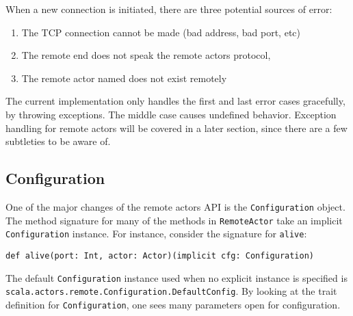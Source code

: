 \documentclass{article}
\begin{document}
When a new connection is initiated, there are three potential sources of error:
\begin{enumerate}
  \item The TCP connection cannot be made (bad address, bad port, etc)
  \item The remote end does not speak the remote actors protocol, 
  \item The remote actor named does not exist remotely
\end{enumerate}
The current implementation only handles the first and last error cases gracefully, by 
throwing exceptions. The middle case causes undefined behavior.
Exception handling for remote actors will be covered in a later section, 
since there are a few subtleties to be aware of.

\subsection{Configuration}
One of the major changes of the remote actors API is the \verb|Configuration| object.
The method signature for many of the methods in \verb|RemoteActor| take an
implicit \verb|Configuration| instance. For instance, consider the signature
for \verb|alive|:
\begin{verbatim}
def alive(port: Int, actor: Actor)(implicit cfg: Configuration)
\end{verbatim}
The default \verb|Configuration| instance used when no explicit instance is specified
is \\ \verb|scala.actors.remote.Configuration.DefaultConfig|. By looking at the trait
definition for \verb|Configuration|, one sees many parameters open for configuration.
\end{document}

